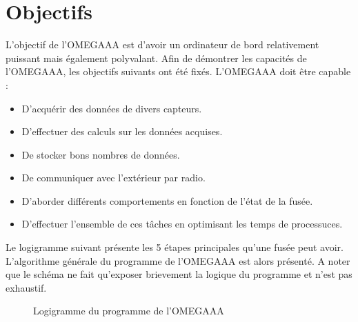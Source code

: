 \section{Objectifs}

L'objectif de l'OMEGAAA est d'avoir un ordinateur de bord relativement puissant
mais également polyvalant. Afin de démontrer les capacités de l'OMEGAAA, les
objectifs suivants ont été fixés. L'OMEGAAA doit être capable :

\begin{itemize}
    \item D'acquérir des données de divers capteurs.
    \item D'effectuer des calculs sur les données acquises.
    \item De stocker bons nombres de données.
    \item De communiquer avec l'extérieur par radio.
    \item D'aborder différents comportements en fonction de
          l'état de la fusée.
    \item D'effectuer l'ensemble de ces tâches en optimisant
          les temps de processuces.\\
\end{itemize}

Le logigramme suivant présente les 5 étapes principales qu'une fusée peut avoir.
L'algorithme générale du programme de l'OMEGAAA est alors présenté. A noter que
le schéma ne fait qu'exposer brievement la logique du programme et n'est pas
exhaustif.

\begin{figure}[h]
    \centering
    
    \caption{Logigramme du programme de l'OMEGAAA}
\end{figure}

